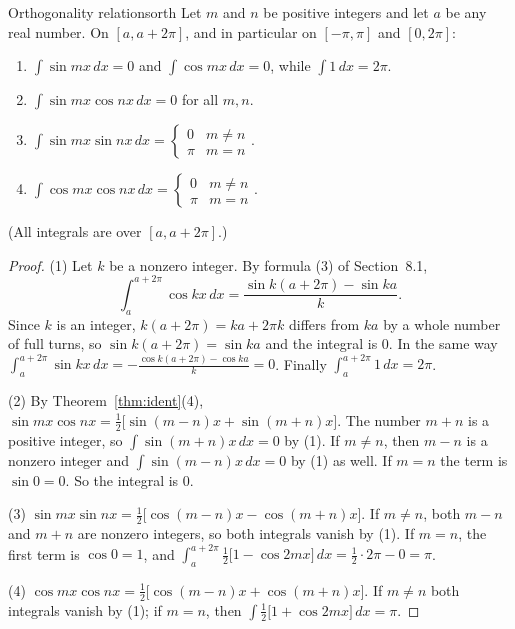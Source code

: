 \documentclass[11pt]{article}
\begin{document}
\begin{thm}{Orthogonality relations}{orth}
Let $m$ and $n$ be positive integers and let $a$ be any real number. On $[a,a+2\pi]$, and in particular on $[-\pi,\pi]$ and $[0,2\pi]$:
\begin{enumerate}[label=(\arabic*)]
  \item $\displaystyle\int\sin mx\,dx=0$ and $\displaystyle\int\cos mx\,dx=0$, while $\displaystyle\int1\,dx=2\pi$.
  \item $\displaystyle\int\sin mx\cos nx\,dx=0$ for all $m,n$.
  \item $\displaystyle\int\sin mx\sin nx\,dx=\begin{cases}0&m\ne n\\\pi&m=n\end{cases}$.
  \item $\displaystyle\int\cos mx\cos nx\,dx=\begin{cases}0&m\ne n\\\pi&m=n\end{cases}$.
\end{enumerate}
(All integrals are over $[a,a+2\pi]$.)
\end{thm}
\begin{proof}
(1) Let $k$ be a nonzero integer. By formula (3) of Section~8.1,
\[\int_a^{a+2\pi}\cos kx\,dx=\frac{\sin k(a+2\pi)-\sin ka}k .\]
Since $k$ is an integer, $k(a+2\pi)=ka+2\pi k$ differs from $ka$ by a whole number of full turns, so $\sin k(a+2\pi)=\sin ka$ and the integral is $0$. In the same way $\int_a^{a+2\pi}\sin kx\,dx=-\frac{\cos k(a+2\pi)-\cos ka}k=0$. Finally $\int_a^{a+2\pi}1\,dx=2\pi$.

(2) By Theorem~\ref{thm:ident}(4), $\sin mx\cos nx=\frac12\big[\sin(m-n)x+\sin(m+n)x\big]$. The number $m+n$ is a positive integer, so $\int\sin(m+n)x\,dx=0$ by (1). If $m\ne n$, then $m-n$ is a nonzero integer and $\int\sin(m-n)x\,dx=0$ by (1) as well. If $m=n$ the term is $\sin0=0$. So the integral is $0$.

(3) $\sin mx\sin nx=\frac12\big[\cos(m-n)x-\cos(m+n)x\big]$. If $m\ne n$, both $m-n$ and $m+n$ are nonzero integers, so both integrals vanish by (1). If $m=n$, the first term is $\cos0=1$, and $\int_a^{a+2\pi}\frac12\big[1-\cos2mx\big]\,dx=\frac12\cdot2\pi-0=\pi$.

(4) $\cos mx\cos nx=\frac12\big[\cos(m-n)x+\cos(m+n)x\big]$. If $m\ne n$ both integrals vanish by (1); if $m=n$, then $\int\frac12\big[1+\cos2mx\big]\,dx=\pi$.
\end{proof}
\end{document}
